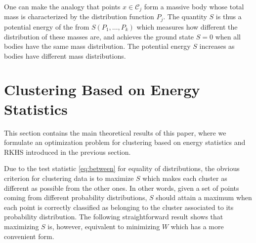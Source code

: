 \documentclass[aps,preprint,nofootinbib,floatfix]{revtex4-1}
\newcommand\C{{\mathcal{C}}}
\begin{document}
One can make the analogy 
that points $ x \in \C_j$ form a massive body 
whose total mass is characterized by the distribution function $P_j$.
The quantity $S$ is thus a potential
energy of the from $S(P_1,\dotsc,P_k)$ which measures how different
the distribution of these masses are,  and achieves the ground state
$S=0$ when all bodies have the same mass distribution. The potential energy
$S$ increases as bodies have different mass distributions.


\section{Clustering Based on Energy Statistics}
\label{sec:clustering_theory}

This section contains the main theoretical results of this paper, where 
we formulate an optimization problem for clustering 
based on energy statistics and RKHS introduced in the previous section.

Due to the test statistic \eqref{eq:between} for equality of distributions,
the obvious
criterion for clustering data is to 
maximize $S$ which makes 
each cluster as different
as possible from the other ones.
In other words, given a set of points coming from different probability
distributions, $S$ should attain a maximum when each point is correctly
classified as belonging to the cluster associated to its probability
distribution.
The following 
straightforward result
shows that maximizing $S$ is, however, equivalent to minimizing
$W$ which has a more convenient form.
\end{document}
